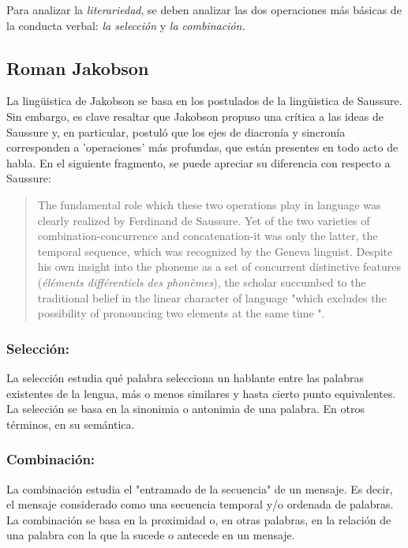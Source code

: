\documentclass[12pt,letterpaper,twoside]{article}
\begin{document}
Para analizar la \emph{literariedad}, se deben analizar las dos operaciones
más básicas de la conducta verbal: \emph{la selección} y \emph{la combinación.} 




\subsection{Roman Jakobson}
\label{sec:orgf683125}

La lingüistica de Jakobson se basa en los postulados de la lingüistica
de Saussure. Sin embargo, es clave resaltar que Jakobson propuso una crítica
a las ideas de Saussure y, en particular, postuló que los ejes de diacronía
y sincronía corresponden a 'operaciones' más profundas, que están presentes
en todo acto de habla. En el siguiente fragmento, se puede apreciar su
diferencia con respecto a Saussure:

\begin{quote}
The fundamental role which these two operations play in language
was clearly realized by Ferdinand de Saussure. Yet of the two
varieties of combination-concurrence and concatenation-it was only
the latter, the temporal sequence, which was recognized by the
Geneva linguist. Despite his own insight into the phoneme as a set
of concurrent distinctive features (\emph{éléments différentiels
des phonèmes}), the scholar succumbed to the traditional belief
in the linear character of language "which excludes the
possibility of pronouncing two elements at the same time ".
\cite[99]{jakobson1956two}
\end{quote}

\subsubsection{Selección:}
\label{sec:org284c12b}

La selección estudia qué palabra selecciona un hablante entre las
palabras existentes de la lengua, más o menos similares y hasta
cierto punto equivalentes. La selección se basa en la sinonimia o
antonimia de una palabra. En otros términos, en su semántica. \cite{jakobson1956two}


\subsubsection{Combinación:}
\label{sec:org1cf2178}

La combinación estudia el "entramado de la secuencia" de un
mensaje. Es decir, el mensaje considerado como una secuencia
temporal y/o ordenada de palabras. La combinación se basa en la
proximidad o, en otras palabras, en la relación de una palabra con
la que la sucede o antecede en un mensaje. \cite{jakobson1956two}
\end{document}
